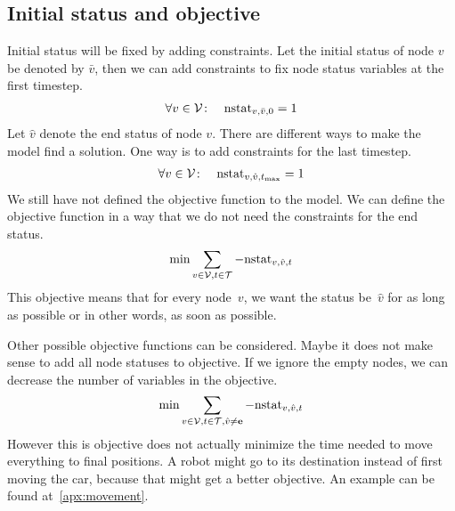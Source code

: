 \subsection{Initial status and objective}
\newcommand{\initW}[1]{\bar{#1}}
\newcommand{\termW}[1]{\hat{#1}}
Initial status will be fixed by adding constraints. Let the initial status of
node $v$ be denoted by $\initW{v}$, then we can add constraints to fix node
status variables at the first timestep.
\begin{align}
    &\forall v \in \V\colon &\nstat_{v,\initW{v},0} = 1
\end{align}
Let $\termW{v}$ denote the end status of node $v$. There are different ways to make
the model find a solution. One way is to add constraints for the last timestep.
\begin{align}
    \label{eq:termcont}
    &\forall v \in \V\colon &\nstat_{v,\termW{v},t_{\max}} = 1
\end{align}
We still have not defined the objective function to the model. We can
define the objective function in a way that we do not need the constraints for
the end status.
\begin{align}
    \label{eq:objtime}
    \min \sum_{v \in \V,t \in \T} -\nstat_{v,\termW{v},t}
\end{align}
This objective means that for every node~$v$, we want the status be~$\termW{v}$
for as long as possible or in other words, as soon as possible.

Other possible objective functions can be considered. Maybe it does not make
sense to add all node statuses to objective. If we ignore the empty nodes, we
can decrease the number of variables in the objective.
\begin{align}
    \label{eq:timeobj}
    \min \sum_{v \in \V,t \in \T,\termW{v} \neq \stat{e}}
    -\nstat_{v,\termW{v},t}
\end{align}
However this is objective does not actually minimize the time needed to move
everything to final positions. A robot might go to its destination instead of
first moving the car, because that might get a better objective. An example can
be found at~\autoref{apx:movement}.

